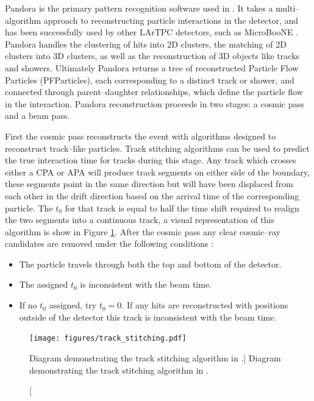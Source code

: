 Pandora \cite{Marshall2015} is the primary pattern recognition software used in
\protodune{}. It takes a multi--algorithm approach to reconstructing particle
interactions in the detector, and has been successfully used by other LArTPC
detectors, such as MicroBooNE \cite{Acciarri:2017hat}. Pandora handles the 
clustering of hits into 2D clusters, the matching of 2D clusters into 3D
clusters, as well as the reconstruction of 3D objects like tracks and 
showers. Ultimately Pandora returns a tree of reconstructed Particle Flow
Particles (PFParticles), each corresponding to a distinct track or shower, and 
connected through parent--daughter relationships, which define the particle flow
in the interaction. Pandora reconstruction proceeds in two stages: a cosmic 
pass and a beam pass. 


First the cosmic pass reconstructs the event with algorithms designed to 
reconstruct track--like particles. Track stitching algorithms can be used to
predict the true interaction time for tracks during this stage. Any track which 
crosses either a CPA or APA will produce track segments on either side of the 
boundary, these segments point in the same direction but will have been 
displaced from each other in the drift direction based on the arrival time of 
the corresponding particle. The $t_0$ for that track is equal to half the time 
shift required to realign the two segments into a continuous track, a visual
representation of this algorithm is show in Figure \ref{fig:track_stitching}. 
After the cosmic pass any clear cosmic--ray candidates are removed under the 
following conditions \cite{protoduneperf}:
\begin{itemize}
	\item The particle travels through both the top and bottom of the detector.
	\item The assigned $t_0$ is inconsistent with the beam time.
	\item If no $t_0$ assigned, try $t_0 = 0$. If any hits are reconstructed 
		with positions outside of the detector this track is inconsistent with the 
		beam time.
\end{itemize}

\begin{figure}

	\centering

	\texttt{[image: figures/track\_stitching.pdf]}

	\caption
	[Diagram demonstrating the track stitching algorithm in \protodune{}.]
	{Diagram demonstrating the track stitching algorithm in \protodune{}.}

	\label{fig:track_stitching}

\end{figure}

